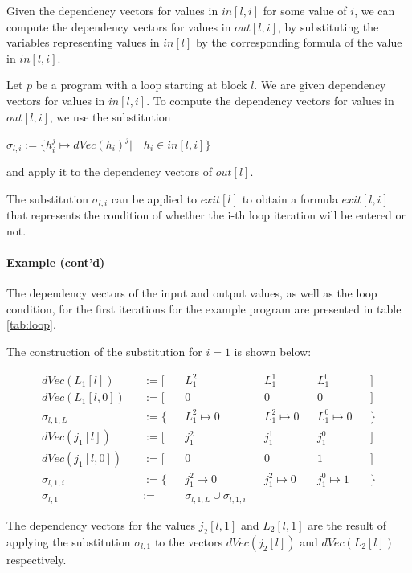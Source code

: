 Given the dependency vectors for values in $in[l, i]$ for some value of $i$, we can compute the dependency vectors for values in $out[l, i]$, by substituting the variables representing values in $in[l]$ by the corresponding formula of the value in $in[l, i]$.

\begin{definition}
    Let $p$ be a program with a loop starting at block $l$. We are given dependency vectors for values in $in[l, i]$. To compute the dependency vectors for values in $out[l, i]$, we use the substitution
    \begin{center}
        $\sigma_{l, i} := \{h_i^j \mapsto dVec(h_i)^j | \quad h_i \in in[l, i]\}$
    \end{center}
    and apply it to the dependency vectors of $out[l]$.
\end{definition}

The substitution $\sigma_{l, i}$ can be applied to $exit[l]$ to obtain a formula $exit[l, i]$ that represents the condition of whether the i-th loop iteration will be entered or not.

\paragraph{Example (cont'd)} The dependency vectors of the input and output values, as well as the loop condition, for the first iterations for the example program are presented in table \ref{tab:loop}.

The construction of the substitution for $i = 1$ is shown below:

\begin{align*}
dVec(L_1[l]) &&:= [ && L_1^2 && L_1^1 && L_1^0 && ]\\
dVec(L_1[l, 0]) &&:= [ && 0 && 0 && 0 && ]\\
\sigma_{l, 1, L} && := \{ && L_1^2 \mapsto 0 && L_1^2 \mapsto 0 && L_1^0 \mapsto 0 && \} \\[1em]
dVec(j_1[l]) &&:= [ && j_1^2 && j_1^1 && j_1^0 && ]\\
dVec(j_1[l, 0]) &&:= [ && 0 && 0 && 1 && ]\\
\sigma_{l, 1, i} && := \{ && j_1^2 \mapsto 0 && j_1^2 \mapsto 0 && j_1^0 \mapsto 1 && \} \\[1em]
\sigma_{l, 1} && := &&\sigma_{l, 1, L} \cup \sigma_{l, 1, i}
\end{align*}

The dependency vectors for the values $j_2[l, 1]$ and $L_2[l, 1]$ are the result of applying the substitution $\sigma_{l, 1}$ to the vectors $dVec(j_2[l])$ and $dVec(L_2[l])$ respectively.


